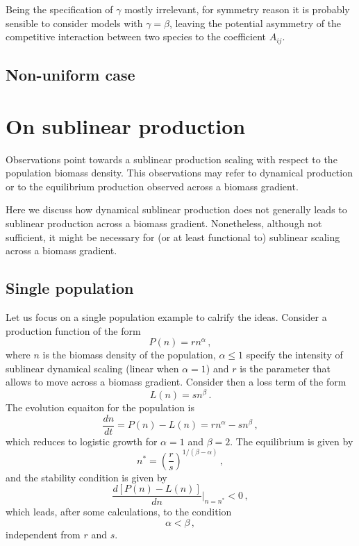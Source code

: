 \documentclass[10pt]{article}
\begin{document}
Being the specification of $\gamma$ 
mostly irrelevant, for symmetry reason it is probably sensible to consider 
models with $\gamma=\beta$,
leaving the potential asymmetry of the competitive interaction between two species
to the coefficient $A_{ij}$.

\subsection{Non-uniform case}

\section{On sublinear production}
Observations point towards a sublinear production scaling
with respect to the population biomass density. 
This observations may refer to
dynamical production or to the equilibrium production observed
across a biomass gradient.

Here we discuss how dynamical sublinear production does not generally leads to 
sublinear production across a biomass gradient.
Nonetheless, although not sufficient, it might be necessary for (or at least
functional to) sublinear scaling across a biomass gradient.

\subsection{Single population}
Let us focus on a single population example to calrify the ideas.
Consider a production function of the form
\begin{equation}
    P(n) = r n^\alpha \, ,
\label{eq: production}
\end{equation}
where $n$ is the biomass density of the population, $\alpha\leq1$
specify the intensity of sublinear dynamical scaling (linear when $\alpha=1$) 
and $r$ is the parameter that allows to move across a biomass gradient.
Consider then a loss term of the form
\begin{equation}
    L(n) = s n^\beta \, .
\end{equation} 
The evolution equaiton for the population is 
\begin{equation}
    \frac{dn}{dt} = P(n) - L(n) = r n^\alpha - s n^\beta \, ,
    \label{eq: single}
\end{equation} 
which reduces to logistic growth for $\alpha=1$ and $\beta=2$.
The equilibrium is given by
\begin{equation}
    n^* = \left(\frac{r}{s}\right)^{1/(\beta-\alpha)} \, ,
\label{eq: equilibrium single}
\end{equation}
and the stability condition is given by
\begin{equation}
    \frac{d\left[P(n)-L(n)\right]}{dn}\bigg|_{n=n^*} < 0 \, ,
\end{equation}
which leads, after some calculations, to the condition
\begin{equation}
    \alpha<\beta \, ,
\end{equation}
independent from $r$ and $s$.
\end{document}
